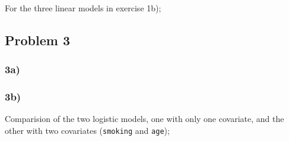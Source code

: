 \documentclass[a4paper,11pt]{article}
\begin{document}
For the three linear models in exercise 1b);
{\footnotesize
    
}

\subsection{Problem 3}
\subsubsection{3a)}
{\footnotesize
    
}


\subsubsection{3b)}
{\footnotesize
    
}

Comparision of the two logistic models, one with only one covariate, and the other with two covariates (\texttt{smoking} and \texttt{age});
{\footnotesize
    
}



%
\end{document}
